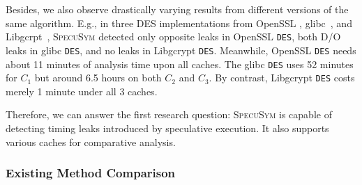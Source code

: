\documentclass[sigconf]{acmart}
\newcommand{\SpecuSym}{\textsc{SpecuSym} }
\begin{document}
Besides, we also observe drastically varying results from different versions 
of the same algorithm. E.g., in three DES implementations from OpenSSL
\cite{OpenSSL111c}, glibc~\cite{glibc}, and Libgcrpt~\cite{Libgcrypt}, 
\SpecuSym detected only opposite leaks in OpenSSL \texttt{DES}, both D/O 
leaks in glibc \texttt{DES}, and no leaks in Libgcrypt \texttt{DES}. Meanwhile, 
OpenSSL \texttt{DES} needs about 11 minutes of analysis time upon all caches. 
The glibc \texttt{DES} uses 52 minutes for $C_1$ but around 6.5 hours on both 
$C_2$ and $C_3$. By contrast, Libgcrypt \texttt{DES} costs merely 1 minute under 
all 3 caches. 


Therefore, we can answer the first research question: \SpecuSym is capable of 
detecting timing leaks introduced by speculative execution. It also supports 
various caches for comparative analysis.


\subsubsection{Existing Method Comparison}
\label{sec:comparison}
\end{document}
